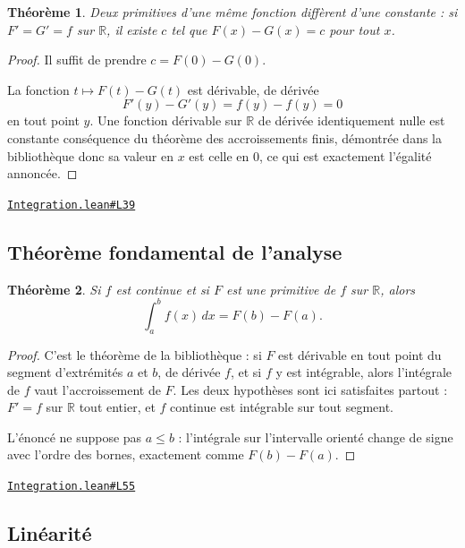 \documentclass[11pt,a4paper]{article}
\theoremstyle{definition}
\theoremstyle{plain}
\newtheorem{theoreme}{Théorème}
\newcommand{\source}[2]{\par\smallskip\noindent\hfill{\footnotesize\href{#1}{\texttt{#2}}}\par\smallskip}
\begin{document}
\begin{theoreme}
Deux primitives d'une même fonction diffèrent d'une constante : si $F' = G' = f$ sur
$\mathbb{R}$, il existe $c$ tel que $F(x) - G(x) = c$ pour tout $x$.
\end{theoreme}

\begin{proof}
Il suffit de prendre $c = F(0) - G(0)$.

La fonction $t \mapsto F(t) - G(t)$ est dérivable, de dérivée
\[ F'(y) - G'(y) = f(y) - f(y) = 0 \]
en tout point $y$. Une fonction dérivable sur $\mathbb{R}$ de dérivée identiquement nulle
est constante \textemdash{} conséquence du théorème des accroissements finis, démontrée
dans la bibliothèque \textemdash{} donc sa valeur en $x$ est celle en $0$, ce qui est
exactement l'égalité annoncée.
\end{proof}
\source{https://github.com/Commutator-IO/learn-lean/blob/main/cours/02-lycee/06-integration/Integration.lean\#L39}{Integration.lean\#L39}

\subsection{Théorème fondamental de l'analyse}

\begin{theoreme}
Si $f$ est continue et si $F$ est une primitive de $f$ sur $\mathbb{R}$, alors
\[ \int_a^b f(x)\,dx = F(b) - F(a) . \]
\end{theoreme}

\begin{proof}
C'est le théorème de la bibliothèque : si $F$ est dérivable en tout point du segment
d'extrémités $a$ et $b$, de dérivée $f$, et si $f$ y est intégrable, alors l'intégrale de
$f$ vaut l'accroissement de $F$. Les deux hypothèses sont ici satisfaites partout :
$F' = f$ sur $\mathbb{R}$ tout entier, et $f$ continue est intégrable sur tout segment.

\medskip\noindent
L'énoncé ne suppose pas $a \le b$ : l'intégrale sur l'intervalle orienté change de signe
avec l'ordre des bornes, exactement comme $F(b) - F(a)$.
\end{proof}
\source{https://github.com/Commutator-IO/learn-lean/blob/main/cours/02-lycee/06-integration/Integration.lean\#L55}{Integration.lean\#L55}

\subsection{Linéarité}
\end{document}
